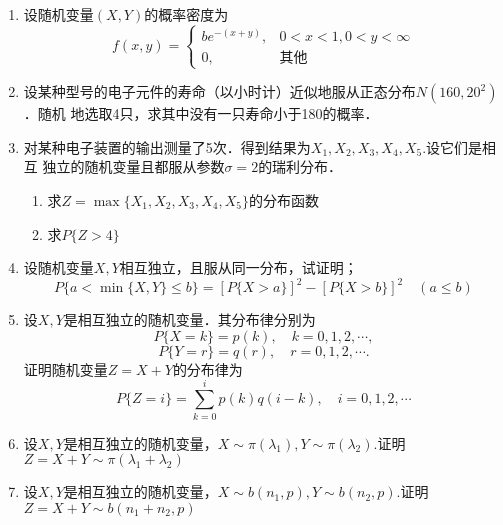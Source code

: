 \documentclass[10pt,a4paper]{article}
\begin{document}
\begin{enumerate}
    \item 设随机变量$(X,Y)$的概率密度为
    $$f(x,y)=\left\{\begin{array}{ll}
        be^{-(x+y)}, & 0<x<1,0<y<\infty\\
        0, & \mbox{其他}
    \end{array}\right.$$
   


    \item 设某种型号的电子元件的寿命（以小时计）近似地服从正态分布$N(160,20^2)$．随机
    地选取4只，求其中没有一只寿命小于180的概率．



    \item 对某种电子装置的输出测量了5次．得到结果为$X_1,X_2,X_3,X_4,X_5$.设它们是相互
    独立的随机变量且都服从参数$\sigma=2$的瑞利分布．
    \begin{enumerate}
        \item 求$Z=\max \{X_1,X_2,X_3,X_4,X_5\}$的分布函数
        \item 求$P\{Z>4\}$
    \end{enumerate}


    \item 设随机变量$X,Y$相互独立，且服从同一分布，试证明；
    $$P\{a<\min \{X,Y\} \leq b\}={[P\{X>a\}]}^2-{[P\{X>b\}]}^2\quad (a\leq b)$$


    \item 设$X,Y$是相互独立的随机变量．其分布律分别为
    $$P\{X=k\}=p(k),\quad k=0,1,2,\cdots,$$
    $$P\{Y=r\}=q(r),\quad r=0,1,2,\cdots.$$
    证明随机变量$Z=X+Y$的分布律为
    $$P\{Z=i\}=\sum _{k=0}^i p(k)q(i-k),\quad i=0,1,2,\cdots$$


    \item 设$X,Y$是相互独立的随机变量，$X\sim \pi(\lambda_1),Y\sim \pi(\lambda_2)$.证明$Z=X+Y\sim \pi(\lambda_1+\lambda_2)$
    
    
    
    \item 设$X,Y$是相互独立的随机变量，$X\sim b(n_1,p),Y\sim b(n_2,p)$.证明$Z=X+Y\sim b(n_1+n_2,p)$
    


\end{enumerate}
\end{document}
